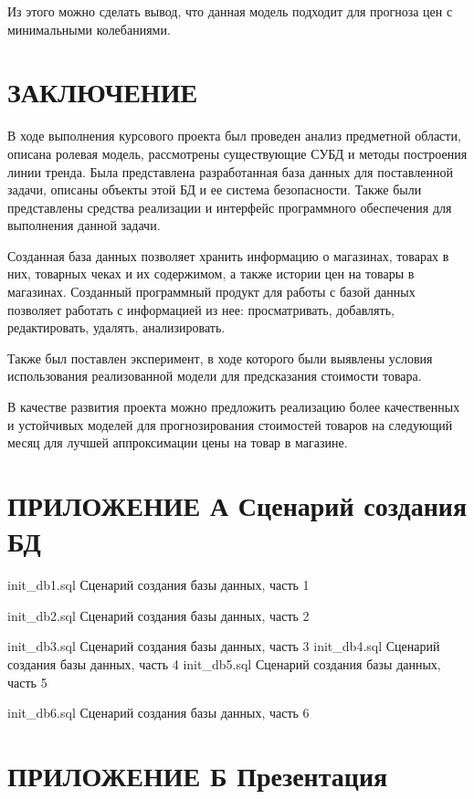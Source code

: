 \documentclass[a4paper]{bmstu}
\begin{document}
Из этого можно сделать вывод, что данная модель подходит для прогноза цен с минимальными колебаниями.


\chapter*{ЗАКЛЮЧЕНИЕ}

В ходе выполнения курсового проекта был проведен анализ предметной области, описана ролевая модель, рассмотрены существующие СУБД и методы построения линии тренда. Была представлена разработанная база данных для поставленной задачи, описаны объекты этой БД и ее система безопасности. Также были представлены средства реализации и интерфейс программного обеспечения для выполнения данной задачи.

Созданная база данных позволяет хранить информацию о магазинах, товарах в них, товарных чеках и их содержимом, а также истории цен на товары в магазинах. Созданный программный продукт для работы с базой данных позволяет работать с информацией из нее: просматривать, добавлять, редактировать, удалять, анализировать.

Также был поставлен эксперимент, в ходе которого были выявлены условия использования реализованной модели для предсказания стоимости товара.

В качестве развития проекта можно предложить реализацию более качественных и устойчивых моделей для прогнозирования стоимостей товаров на следующий месяц для лучшей аппроксимации цены на товар в магазине. 

\makebibliography

\chapter*{ПРИЛОЖЕНИЕ А Сценарий создания БД}


	{init_db1.sql}
	{Сценарий создания базы данных, часть 1}
	
	{init_db2.sql}
	{Сценарий создания базы данных, часть 2}

	{init_db3.sql}
	{Сценарий создания базы данных, часть 3}
\newpage
{}
	{init_db4.sql}
	{Сценарий создания базы данных, часть 4}
\newpage
{}
	{init_db5.sql}
	{Сценарий создания базы данных, часть 5}

	{init_db6.sql}
	{Сценарий создания базы данных, часть 6}

\chapter*{ПРИЛОЖЕНИЕ Б Презентация}
\end{document}
